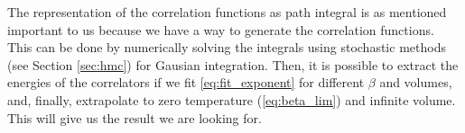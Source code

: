 The representation of the correlation functions as path integral is as mentioned important to us because we have a way to generate the correlation functions. This can be done by numerically solving the integrals using stochastic methods (see Section \ref{sec:hmc}) for Gausian integration. Then, it is possible to extract the energies of the correlators if we fit \ref{eq:fit_exponent} for different $\beta$ and volumes, and, finally, extrapolate to zero temperature (\ref{eq:beta_lim}) and infinite volume. This will give us the result we are looking for.


